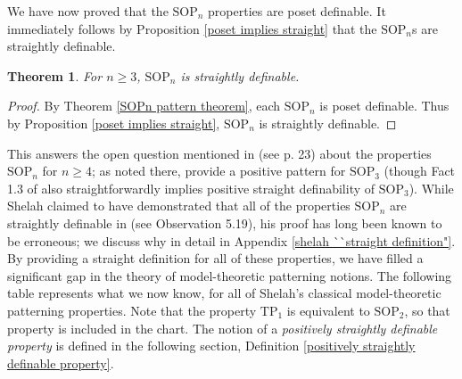 \documentclass{article}
\newcommand{\SOP}{\text{SOP}}
\newcommand{\TPi}{\text{TP}_1}
\newtheorem{theorem}{Theorem}
\theoremstyle{definition}
\theoremstyle{definition}
\theoremstyle{definition}
\begin{document}
We have now proved that the $\SOP_n$ properties are poset definable. It immediately follows by Proposition \ref{poset implies straight} that the $\SOP_n$s are straightly definable. 

\begin{theorem}\label{SOPn straightly definable}
    For $n\geq 3$, $\mathrm{SOP}_n$ is straightly definable.
\end{theorem}

\begin{proof}
    By Theorem \ref{SOPn pattern theorem}, each $\SOP_n$ is poset definable. Thus by Proposition \ref{poset implies straight}, $\SOP_n$ is straightly definable.
\end{proof}

This answers the open question mentioned in \cite{bailetti2024walk} (see p. 23) about the properties $\text{SOP}_n$ for $n\geq 4$; as noted there, \cite{kaplan2024generic} provide a positive pattern for $\SOP_3$ (though Fact 1.3 of \cite{shelah_usvyatsov_2008} also straightforwardly implies positive straight definability of $\mathrm{SOP}_{3}$).  While Shelah claimed to have demonstrated that all of the properties $\SOP_n$  are straightly definable in \cite{shelah_what_2000} (see Observation 5.19), his proof has long been known to be erroneous; we discuss why in detail in Appendix \ref{shelah ``straight definition"}. By providing a straight definition for all of these properties, we have filled a significant gap in the theory of model-theoretic patterning notions. The following table represents what we now know, for all of Shelah's classical model-theoretic patterning properties. Note that the property $\TPi$ is equivalent to $\SOP_2$, so that property is included in the chart. The notion of a \textit{positively straightly definable property} is defined in the following section, Definition \ref{positively straightly definable property}.


\:
\end{document}
